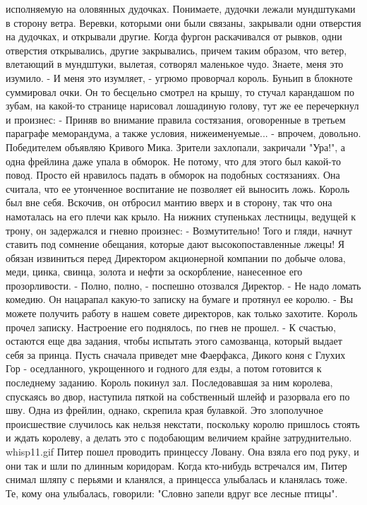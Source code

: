 исполняемую на оловянных дудочках. Понимаете, дудочки лежали 
мундштуками в сторону ветра. Веревки, которыми они были связаны, 
закрывали одни отверстия на дудочках, и открывали другие. Когда фургон 
раскачивался от рывков, одни отверстия открывались, другие 
закрывались, причем таким образом, что ветер, влетающий в мундштуки, 
вылетая, сотворял маленькое чудо. Знаете, меня это изумило.
    - И меня это изумляет, - угрюмо проворчал король.
    Буньип в блокноте суммировал очки. Он то бесцельно смотрел на 
крышу, то стучал карандашом по зубам, на какой-то странице нарисовал 
лошадиную голову, тут же ее перечеркнул и произнес:
    - Приняв во внимание правила состязания, оговоренные в третьем 
параграфе меморандума, а также условия, нижеименуемые... - впрочем, 
довольно. Победителем объявляю Кривого Мика.
    Зрители захлопали, закричали "Ура!", а одна фрейлина даже упала в 
обморок. Не потому, что для этого был какой-то повод. Просто ей 
нравилось падать в обморок на подобных состязаниях. Она считала, что 
ее утонченное воспитание не позволяет ей выносить ложь.
    Король был вне себя. Вскочив, он отбросил мантию вверх и в 
сторону, так что она намоталась на его плечи как крыло. На нижних 
ступеньках лестницы, ведущей к трону, он задержался и гневно произнес:
    - Возмутительно! Того и гляди, начнут ставить под сомнение 
обещания, которые дают высокопоставленные лжецы! Я обязан извиниться 
перед Директором акционерной компании по добыче олова, меди, цинка, 
свинца, золота и нефти за оскорбление, нанесенное его прозорливости.
    - Полно, полно, - поспешно отозвался Директор. - Не надо ломать 
комедию.
    Он нацарапал какую-то записку на бумаге и протянул ее королю.
    - Вы можете получить работу в нашем совете директоров, как только 
захотите.
    Король прочел записку. Настроение его поднялось, по гнев не 
прошел.
    - К счастью, остаются еще два задания, чтобы испытать этого 
самозванца, который выдает себя за принца. Пусть сначала приведет мне 
Фаерфакса, Дикого коня с Глухих Гор - оседланного, укрощенного и 
годного для езды, а потом готовится к последнему заданию.
    Король покинул зал. Последовавшая за ним королева, спускаясь во 
двор, наступила пяткой на собственный шлейф и разорвала его по шву. 
Одна из фрейлин, однако, скрепила края булавкой. Это злополучное 
происшествие случилось как нельзя некстати, поскольку королю пришлось 
стоять и ждать королеву, а делать это с подобающим величием крайне 
затруднительно.
    {whisp11.gif}
    Питер пошел проводить принцессу Ловану. Она взяла его под руку, и 
они так и шли по длинным коридорам. Когда кто-нибудь встречался им, 
Питер снимал шляпу с перьями и кланялся, а принцесса улыбалась и 
кланялась тоже. Те, кому она улыбалась, говорили: "Словно запели вдруг 
все лесные птицы".
